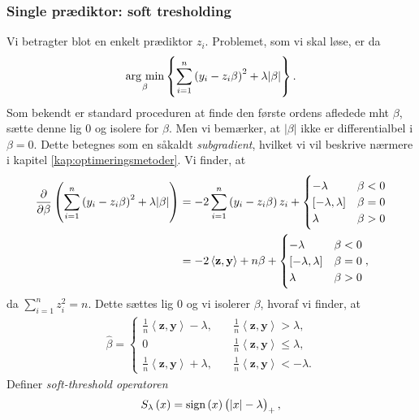 \subsubsection{Single prædiktor: soft tresholding}
Vi betragter blot en enkelt prædiktor \(z_i\). 
Problemet, som vi skal løse, er da
\begin{align*}
\argmin_{\beta} \cbr{\sum_{i=1}^n \del{y_i - z_{i} \beta}^2 + \lambda \vert \beta \vert}.
\end{align*}
Som bekendt er standard proceduren at finde den første ordens afledede mht $\beta$, sætte denne lig 0 og isolere for $\beta$. 
Men vi bemærker, at \(\vert \beta \vert \) ikke er differentialbel i $\beta=0$.
Dette betegnes som en såkaldt \textit{subgradient}, hvilket vi vil beskrive nærmere i kapitel \ref{kap:optimeringsmetoder}.
Vi finder, at
\begin{align*}
\frac{\partial}{\partial \beta} \del{\sum_{i=1}^n \del{y_i - z_{i} \beta}^2 + \lambda \vert \beta \vert}
&= -2\sum_{i=1}^n \del{y_i - z_{i} \beta} z_i + \begin{cases}
-\lambda \quad &\beta < 0 \\
[-\lambda, \lambda] & \beta = 0 \\
\lambda & \beta >0 
\end{cases}  \\
&= -2 \left\langle \mathbf{z}, \mathbf{y} \right\rangle + n\beta + \begin{cases}
-\lambda \quad &\beta < 0 \\
[-\lambda, \lambda] & \beta = 0 \\
\lambda & \beta >0 
\end{cases},
\end{align*}
da $\sum_{i=1}^n z_i^2=n$. Dette sættes lig 0 og vi isolerer $\beta$, hvoraf vi finder, at
\begin{align}
\hat{\beta} = \begin{cases}
\frac{1}{n} \left\langle \mathbf{z}, \mathbf{y} \right\rangle - \lambda, \quad &\frac{1}{n} \left\langle \mathbf{z}, \mathbf{y} \right\rangle > \lambda, \\
0 &\frac{1}{n} \left\langle \mathbf{z}, \mathbf{y} \right\rangle \leq \lambda, \\
\frac{1}{n} \left\langle \mathbf{z}, \mathbf{y} \right\rangle + \lambda, &\frac{1}{n} \left\langle \mathbf{z}, \mathbf{y} \right\rangle < -\lambda.
\end{cases} \label{eq:2.10}
\end{align}
Definer \textit{soft-threshold operatoren}
\begin{align*}
S_\lambda\del{x}=\text{sign}\del{x} \del{\vert x \vert - \lambda}_+,
\end{align*}
